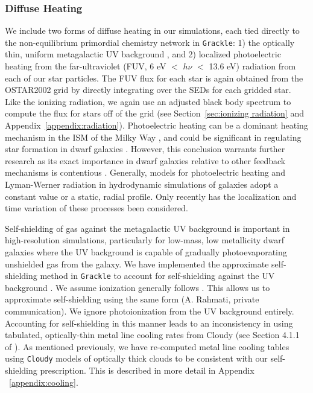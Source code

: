 \documentclass[twocolumn]{aastex61}
\begin{document}
\subsubsection{Diffuse  Heating}
\label{sec:diffusive heating}
We include two forms of diffuse heating in our simulations, each tied directly to the non-equilibrium primordial chemistry network in \texttt{Grackle}: 1) the optically thin, uniform metagalactic UV background \citep{HM2012}, and 2) localized photoelectric heating from the far-ultraviolet (FUV, 6 eV $<$ $h\nu$ $<$ 13.6 eV) radiation from each of our star particles. The FUV flux for each star is again obtained from the OSTAR2002 grid by directly integrating over the SEDs for each gridded star. Like the ionizing radiation, we again use an adjusted black body spectrum to compute the flux for stars off of the grid (see Section~\ref{sec:ionizing radiation} and Appendix~\ref{appendix:radiation}). Photoelectric heating can be a dominant heating mechanism in the ISM of the Milky Way \citep{Parravano2003}, and could be significant in regulating star formation in dwarf galaxies \citep{Forbes2016}. However, this conclusion warrants further research as its exact importance in dwarf galaxies relative to other feedback mechanisms is contentious \citep{Hu2016,Hu2017}. Generally, models for photoelectric heating and Lyman-Werner radiation in hydrodynamic simulations of galaxies adopt a constant value or a static, radial profile. Only recently has the localization and time variation of these processes been considered.

Self-shielding of gas against the metagalactic UV background is important in high-resolution simulations, particularly for low-mass, low metallicity dwarf galaxies where the UV background is capable of gradually photoevaporating unshielded gas from the galaxy. We have implemented the \citet{Rahmati2013} approximate self-shielding method in \texttt{Grackle} to account for  self-shielding against the UV background \citep[see][ for more details of this implementation]{GrackleMethod}. We assume  ionization generally follows . This allows us to approximate  self-shielding using the same form (A. Rahmati, private communication). We ignore  photoionization from the UV background entirely. Accounting for self-shielding in this manner leads to an inconsistency in using tabulated, optically-thin metal line cooling rates from Cloudy (see Section 4.1.1 of \citet{Hu2017}). As mentioned previously, we have re-computed metal line cooling tables using \texttt{Cloudy} models of optically thick clouds to be consistent with our self-shielding prescription. This is described in more detail in Appendix ~\ref{appendix:cooling}. 
\end{document}
